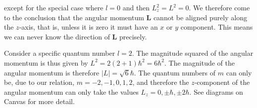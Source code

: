 \documentclass[11pt]{amsart}
\begin{document}
except for the special case where $l = 0$ and then $L_z^2 = L^2 = 0$. We therefore come to the conclusion that the angular momentum $\mathbf{L}$ cannot be aligned purely along the $z$-axis, that is, unless it is zero it must have an $x$ or $y$ component. This means we can never know the direction of $\mathbf{L}$ precisely.

Consider a specific quantum number $l = 2$. The magnitude squared of the angular momentum is thus given by $L^2 = 2(2+1)\hbar^2 = 6\hbar^2$. The magnitude of the angular momentum is therefore $|L| = \sqrt{6}\hbar$. The quantum numbers of $m$ can only be, due to our relation, $m = -2, -1, 0, 1, 2$, and therefore the $z$-component of the angular momentum can only take the values $L_z = 0, \pm\hbar, \pm 2\hbar$. See diagrams on Canvas for more detail.
\end{document}
